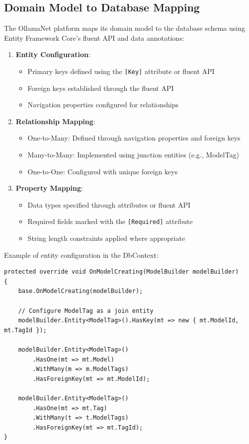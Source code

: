 \subsection{Domain Model to Database Mapping}

The OllamaNet platform maps its domain model to the database schema using Entity Framework Core's fluent API and data annotations:

\begin{enumerate}
   \item \textbf{Entity Configuration}:
   \begin{itemize}
      \item Primary keys defined using the \texttt{[Key]} attribute or fluent API
      \item Foreign keys established through the fluent API
      \item Navigation properties configured for relationships
   \end{itemize}

   \item \textbf{Relationship Mapping}:
   \begin{itemize}
      \item One-to-Many: Defined through navigation properties and foreign keys
      \item Many-to-Many: Implemented using junction entities (e.g., ModelTag)
      \item One-to-One: Configured with unique foreign keys
   \end{itemize}

   \item \textbf{Property Mapping}:
   \begin{itemize}
      \item Data types specified through attributes or fluent API
      \item Required fields marked with the \texttt{[Required]} attribute
      \item String length constraints applied where appropriate
   \end{itemize}
\end{enumerate}

Example of entity configuration in the DbContext:

\begin{verbatim}
protected override void OnModelCreating(ModelBuilder modelBuilder)
{
    base.OnModelCreating(modelBuilder);

    // Configure ModelTag as a join entity
    modelBuilder.Entity<ModelTag>().HasKey(mt => new { mt.ModelId, mt.TagId });

    modelBuilder.Entity<ModelTag>()
        .HasOne(mt => mt.Model)
        .WithMany(m => m.ModelTags)
        .HasForeignKey(mt => mt.ModelId);

    modelBuilder.Entity<ModelTag>()
        .HasOne(mt => mt.Tag)
        .WithMany(t => t.ModelTags)
        .HasForeignKey(mt => mt.TagId);
}
\end{verbatim}

